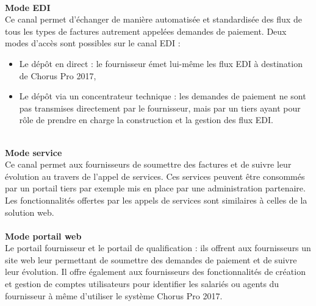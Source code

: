 \documentclass[12pt,a4paper]{article}
\begin{document}
~~\\
\textbf{Mode EDI}
~~\\
Ce canal permet d’échanger de manière automatisée et standardisée des flux de tous les types de factures autrement appelées demandes de paiement. Deux modes d’accès sont possibles sur le canal EDI :
\begin{itemize}
\item Le dépôt en direct : le fournisseur émet lui-même les flux EDI à destination de Chorus Pro 2017,
\item Le dépôt via un concentrateur technique : les demandes de paiement ne sont pas transmises directement par le fournisseur, mais par un tiers ayant pour rôle de prendre en charge la construction et la gestion des flux EDI. 
\end{itemize}
~~\\
\textbf{Mode service}
~~\\
Ce canal permet aux fournisseurs de soumettre des factures et de suivre leur évolution au travers de l'appel de services. Ces services peuvent être consommés par un portail tiers par exemple mis en place par une administration partenaire. Les fonctionnalités offertes par les appels de services sont similaires à celles de la solution web.
~~\\
~~\\
\textbf{Mode portail web}
~~\\
Le portail fournisseur et le portail de qualification : ils offrent aux fournisseurs un site web leur permettant de soumettre des demandes de paiement et de suivre leur évolution. Il offre également aux fournisseurs des fonctionnalités de création et gestion de comptes utilisateurs pour identifier les salariés ou agents du fournisseur à même d’utiliser le système Chorus Pro 2017.
\clearpage
\newpage
\end{document}
